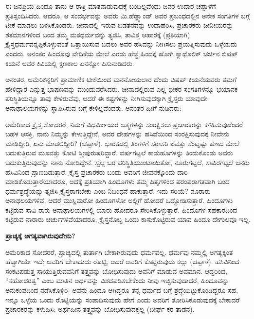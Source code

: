 ಈ ಜನಪ್ರಿಯ ಹಿಂದೂ ತಾನು ಆ ರಾತ್ರಿ ಮಾತನಾಡುವುದಕ್ಕೆ ಬಂದಿಲ್ಲವೆಂದು ಜನರ ಉದಾರ ಚಪ್ಪಾಳೆಗೆ ಪ್ರತಿಸ್ಪಂದಿಸಿದರು. ಆದರೂ, ಆ ಸಂದರ್ಭವನ್ನು ಅವರು ಮಿ.ಹೆಡ್ಲ್ಯಾಂಡ್ ಅವರ ಪ್ರಬಂಧದಲ್ಲಿನ ಅನೇಕ ಸಂಗತಿಗಳ ಬಗ್ಗೆ ಟೀಕೆ ಮಾಡಲು ಬಳಸಿಕೊಂಡರು. ಚೀನಾದಲ್ಲಿ ಇರುವ ಬಡತನವನ್ನು ಉದಾಹರಿಸಿ, ಪ್ರಚಾರಕರು ಚೀನೀಯರನ್ನು ಶತಮಾನಗಳಿಂದ ಬಂದ ತಮ್ಮ ಮತಧರ್ಮವನ್ನು ತ್ಯಜಿಸಿ, ತಾವಿತ್ತ ಆಹಾರಕ್ಕೆ (ಪ್ರತಿಯಾಗಿ) ಕ್ರೈಸ್ತಧರ್ಮವನ್ನಪ್ಪಿಕೊಳ್ಳುವಂತೆ ಒತ್ತಾಯಿಸುವ ಬದಲು ಅವರ ಹಸಿವನ್ನು ನೀಗಿಸಲು ಪ್ರಯತ್ನಿಸುವುದು ಒಳ್ಳೆಯದು ಎಂದರು. ಅನಂತರ ಹಿಂದೂವು ವೇದಿಕೆಯ ಮೇಲೆ ಎರಡು ಹೆಜ್ಜೆ ಹಿಂದಕ್ಕೆ ಹೋಗಿ ಕ್ಯಾಥೊಲಿಕ್ ಚರ್ಚಿನ ಬಿಷಪ್ ಕಿಯನೆ ಅವರ ಕಿವಿಯಲ್ಲಿ ಕ್ಷಣಕಾಲ ಏನನ್ನೋ ಪಿಸುನುಡಿದರು.

ಅನಂತರ, ಅಮೆರಿಕನ್ನರಿಗೆ ಪ್ರಾಮಾಣಿಕ ಟೀಕೆಯಿಂದ ಮನನೋಯಲಾರ ದೆಂದು ಬಿಷಪ್ ಕಿಯನೆಯವರು ತಮಗೆ ಹೇಳಿದ್ದಾರೆ ಎನ್ನುತ್ತ ಭಾಷಣವನ್ನು ಮುಂದುವರೆಸಿದರು. ಚೀನಾದಲ್ಲಿರುವ ಎಲ್ಲ ಭೀಕರ ಸಂಗತಿಗಳನ್ನೂ ಭಯಾನಕ ಪರಿಸ್ಥಿತಿಯನ್ನೂ ತಾವು ಕೇಳಿರುವೆವು, ಆದರೆ ಈ ಕಷ್ಟಗಳನ್ನು ನೀಗಿಸುವುದಕ್ಕಾಗಿ ಕ್ರೈಸ್ತರು ಯಾವುದೇ ಅನಾಥಾಲಯಗಳನ್ನು ಸ್ಥಾಪಿಸಿರುವ ಬಗ್ಗೆ ಕೇಳಿಲ್ಲವೆಂದರು. ಅನಂತರ ಹೀಗೆ ನುಡಿದರು:

ಅಮೆರಿಕಾದ ಕ್ರೈಸ್ತ ಸೋದರರೆ, ನಿಮಗೆ ವಿಧರ್ಮೀಯರ ಆತ್ಮಗಳನ್ನು ಸಂರಕ್ಷಿಸಲು ಪ್ರಚಾರಕರನ್ನು ಕಳಿಹಿಸುವುದೆಂದರೆ ಬಹಳ ಆಸಕ್ತಿ. ನಾನು ನಿಮ್ಮನ್ನು ಕೇಳುತ್ತಿದ್ದೇನೆ, ಅವರ ದೇಹಗಳನ್ನು ಹಸಿವೆಯಿಂದ ಸಂರಕ್ಷಿಸುವುದಕ್ಕೆ ನೀವೇನು ಮಾಡಿದ್ದೀರಿ, ಏನು ಮಾಡಲಿದ್ದೀರಿ? (ಚಪ್ಪಾಳೆ). ಭಾರತದಲ್ಲಿ ತಿಂಗಳಿಗೆ ಸರಾಸರಿ ಐವತ್ತು ಸೆಂಟ್ನಷ್ಟು ಹಣದ ಮೇಲೆ ಬದುಕುತ್ತಿರುವ ಮೂವತ್ತು ಕೋಟಿ ಸ್ತ್ರೀಪುರುಷರಿದ್ದಾರೆ. ವರ್ಷಗಟ್ಟಲೆ ಕಾಡುಹೂಗಳನ್ನು ತಿಂದುಕೊಂಡು ಅವರು ಬದುಕುತ್ತಿರುವುದನ್ನು ನಾನು ನೋಡಿದ್ದೇನೆ. ಸ್ವಲ್ಪ ಬರ ಪರಿಸ್ಥಿತಿಯುಂಟಾಯಿತೋ, ನೂರುಗಟ್ಟಲೆ, ಸಾವಿರಗಟ್ಟಲೆ ಜನರು ಹಸಿವಿನಿಂದ ಪ್ರಾಣಬಿಡುತ್ತಾರೆ. ಕ್ರೈಸ್ತ ಪ್ರಚಾರಕರು ಬಂದು ಅವರಿಗೆ ಜೀವನಕ್ಕೊಂದು ದಾರಿ ಮಾಡಿಕೊಡುತ್ತಾರೆಯಾದರೂ, ಅದಕ್ಕೆ ಪ್ರತಿಯಾಗಿ ಹಿಂದೂಗಳು ತಮ್ಮ ಪಿತೃಗಳಿಂದ ಪರಂಪರಾಗತವಾಗಿ ಬಂದ ಧರ್ಮಶ್ರದ್ಧೆಯನ್ನು ತ್ಯಜಿಸಿ ಕ್ರೈಸ್ತರಾಗಬೇಕು ಎಂಬ ನಿಬಂಧನೆ ಹಾಕುತ್ತಾರೆ. ಇದು ಸರಿಯೆ? ನೂರಾರು ಅನಾಥಲಯಗಳಿವೆ. ಆದರೆ ಮುಸ್ಲಿಮರೋ ಹಿಂದೂಗಳೋ ಅಲ್ಲಿಗೆ ಹೋದರೆ ಒದ್ದೋಡಿಸುತ್ತಾರೆ. ಹಿಂದೂಗಳು ಕಟ್ಟಿರುವ ಸಾವಿ ರಾರು ಅನಾಥಾಲಯಗಳಲ್ಲಿ ಯಾರು ಹೋದರೂ ಸೇರಿಸಿಕೊಳ್ಳುತ್ತಾರೆ. ಹಿಂದೂಗಳ ಸಹಕಾರದಿಂದ ಕಟ್ಟಿರುವ ನಾರಾರು ಚರ್ಚುಗಳಿವೆಯಾದರೂ, ಕ್ರೈಸ್ತನೊಬ್ಬ ಒಂದು ಕಾಸುಕೊಟ್ಟಿರುವ ಯಾವ ಹಿಂದೂ ದೇಗುಲವೂ ಇಲ್ಲ.

\begin{center}
\textbf{ಪ್ರಾಚ್ಯಕ್ಕೆ ಅಗತ್ಯವಾಗಿರುವುದೇನು?}
\end{center}

ಅಮೆರಿಕಾದ ಸೋದರರೆ, ಪ್ರಾಚ್ಯದಲ್ಲಿ ತುರ್ತಾಗಿ ಬೇಕಾಗಿರುವುದು ಧರ್ಮವಲ್ಲ. ಧರ್ಮವು ನಮ್ಮಲ್ಲಿ ಅಗತ್ಯಕ್ಕಿಂತ ಹೆಚ್ಚಾಗಿಯೇ ಇದೆ; ಅವರಿಗೆ ಬೇಕಾದುದು ರೊಟ್ಟಿ, ಆದರೆ ಅವರಿಗೆ ಕೊಟ್ಟಿರುವುದು ಕಲ್ಲು (ಚಪ್ಪಾಳೆ). ಹಸಿವಿನಿಂದ ಸಂಕಟಪಡುತ್ತ ಸಾಯುತ್ತಿರುವವನಿಗೆ ತತ್ತ್ವವನ್ನು ಬೋಧಿಸುವುದು ಅವನಿಗೆ ಮಾಡುವ ಅವಮಾನ. ಆದ್ದರಿಂದ, “ಸಹೋದರತ್ವ” ಎಂಬ ಮಾತಿನ ಅರ್ಥವನ್ನು ವಿಶದಪಡಿಸಬೇಕೆಂದು ನೀವು ಇಚ್ಛಿಸುವುದಾದರೆ, ಹಿಂದೂವನ್ನು ಅನುಕಂಪದಿಂದ ನಡೆಸಿಕೊಳ್ಳಿರಿ- ಅವನು ಹಿಂದೂ ಆಗಿದ್ದರೂ ತನ್ನ ಧರ್ಮದ ಬಗ್ಗೆ ಶ್ರದ್ಧೆಯಿಟ್ಟುಕೊಂಡಿದ್ದರೂ ಸಹ, ಇನ್ನೂ ಒಳ್ಳೆಯ ಒಂದು ರೊಟ್ಟಿಯನ್ನು ಸಂಪಾದಿಸುವುದು ಹೇಗೆ ಎಂದು ಅವರಿಗೆ ತೋರಿಸಿಕೊಡುವುದಕ್ಕೆ ಬೇಕಾದರೆ ಪ್ರಚಾರಕರನ್ನು ಕಳುಹಿಸಿ; ಅರ್ಥಹೀನ ತತ್ತ್ವವನ್ನು ಬೋಧಿಸುವುದಕ್ಕಲ್ಲ (ದೀರ್ಘ ಕರ ತಾಡನ).

